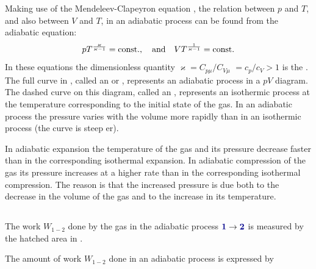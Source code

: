 Making use of the Mendeleev-Clapeyron equation , the relation between $p$ and $T$, and also between $V$ and $T$, in an adiabatic process can be found from the adiabatic equation:
\begin{equation*}%
pT^{\frac{\varkappa}{\varkappa -1}} = \textrm{const.}, \qand VT^{\frac{1}{\varkappa -1}}= \textrm{const}.
\end{equation*}
In these equations the dimensionless quantity $\varkappa = C_{p\mu}/C_{V\mu}$ $= c_{p}/c_{V} > 1$ is the . The full curve in , called an  or , represents an adiabatic process in a $pV$ diagram. The dashed curve on this diagram, called an , represents an isothermic process at the temperature corresponding to the initial state  of the gas. In an adiabatic process the pressure varies with the volume more rapidly than in an isothermic process (the curve is steep­ er). 

In adiabatic expansion the temperature of the gas and its pressure decrease faster than in the corresponding isothermal expansion. In adiabatic compression of the gas its pressure increases at a higher rate than in the corresponding isothermal compression. The reason is that the increased pressure is due both to the decrease in the volume of the gas and to the increase in its temperature.

\subsection{}\label{9.5.12} The work $W_{1-2}$ done by the gas in the adiabatic process $\hlblue{1} \to \hlblue{2}$ is measured by the hatched area in .

The amount of work $W_{1-2}$ done in an adiabatic process is ex­pressed by


